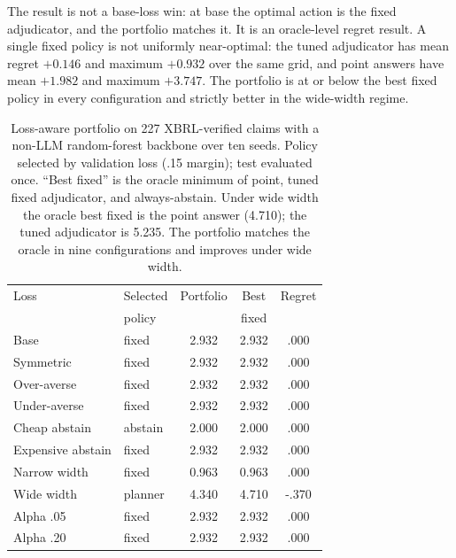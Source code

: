 \documentclass[11pt]{article}
\begin{document}
The result is not a base-loss win: at base the optimal action is the fixed adjudicator, and the portfolio matches it. It is an oracle-level regret result. A single fixed policy is not uniformly near-optimal: the tuned adjudicator has mean regret \(+0.146\) and maximum \(+0.932\) over the same grid, and point answers have mean \(+1.982\) and maximum \(+3.747\). The portfolio is at or below the best fixed policy in every configuration and strictly better in the wide-width regime.

\begin{table}[t]
\centering
\small
\setlength{\tabcolsep}{3pt}
\begin{tabular}{llccc}
\toprule
Loss & Selected & Portfolio & Best & Regret \\
 & policy & & fixed & \\
\midrule
Base & fixed & 2.932 & 2.932 & .000 \\
Symmetric & fixed & 2.932 & 2.932 & .000 \\
Over-averse & fixed & 2.932 & 2.932 & .000 \\
Under-averse & fixed & 2.932 & 2.932 & .000 \\
Cheap abstain & abstain & 2.000 & 2.000 & .000 \\
Expensive abstain & fixed & 2.932 & 2.932 & .000 \\
Narrow width & fixed & 0.963 & 0.963 & .000 \\
Wide width & planner & 4.340 & 4.710 & -.370 \\
Alpha .05 & fixed & 2.932 & 2.932 & .000 \\
Alpha .20 & fixed & 2.932 & 2.932 & .000 \\
\bottomrule
\end{tabular}
\caption{Loss-aware portfolio on 227 XBRL-verified claims with a non-LLM random-forest backbone over ten seeds. Policy selected by validation loss (.15 margin); test evaluated once. ``Best fixed'' is the oracle minimum of point, tuned fixed adjudicator, and always-abstain. Under wide width the oracle best fixed is the point answer (4.710); the tuned adjudicator is 5.235. The portfolio matches the oracle in nine configurations and improves under wide width.}
\label{tab:portfolio}
\end{table}
\end{document}
